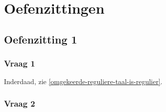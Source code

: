 \documentclass[main.tex]{subfiles}
\begin{document}
\chapter{Oefenzittingen}
\label{cha:oefenzittingen}

\section{Oefenzitting 1}
\label{sec:oefenzitting-1}

\subsection*{Vraag 1}
Inderdaad, zie \ref{omgekeerde-reguliere-taal-is-regulier}.

\subsection*{Vraag 2}
\end{document}
